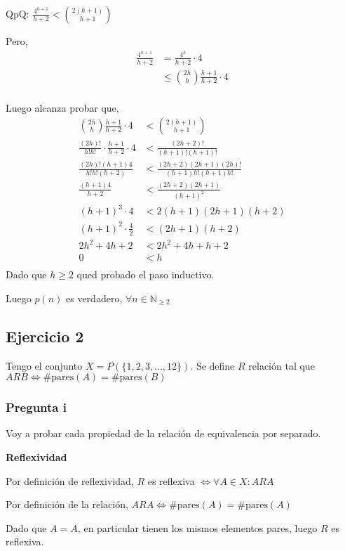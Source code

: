 QpQ: $ \frac{4^{h+1}}{h+2} < \binom{2(h+1)}{h+1} $

Pero,
\begin{align*}
    \frac{4^{h+1}}{h+2} &= \frac{4^h}{h+2} \cdot 4 \\
    &\leq \binom{2h}{h}\frac{h+1}{h+2} \cdot 4 \\
\end{align*}

Luego alcanza probar que,
\begin{align*}
    \binom{2h}{h}\frac{h+1}{h+2} \cdot 4 &< \binom{2(h+1)}{h+1} \\
    \frac{(2h)!}{h!h!} \cdot \frac{h+1}{h+2} \cdot 4 &< \frac{(2h+2)!}{(h+1)!(h+1)!} \\
    \frac{(2h)!(h+1)4}{h!h!(h+2)} &< \frac{(2h+2)(2h+1)(2h)!}{(h+1)h!(h+1)h!} \\
    \frac{(h+1)4}{h+2} &< \frac{(2h+2)(2h+1)}{(h+1)^2} \\
    (h+1)^3 \cdot 4 &< 2(h+1)(2h+1)(h+2) \\
    (h+1)^2 \cdot \frac{4}{2} &< (2h+1)(h+2) \\
    2h^2 + 4h + 2 &< 2h^2 + 4h + h + 2 \\
    0 &< h \\
\end{align*}
Dado que $ h \geq 2 $ qued probado el paso inductivo.

Luego $ p(n) $ es verdadero, $ \forall n \in \mathbb{N}_{\geq 2}$

\subsection{Ejercicio 2}

Tengo el conjunto $ X = P(\{ 1,2,3,...,12 \}) $. Se define $R$ relación tal que $ ARB \iff \#\text{pares}(A) = \#\text{pares}(B) $

\subsubsection{Pregunta i}

Voy a probar cada propiedad de la relación de equivalencia por separado.

\textbf{Reflexividad}

Por definición de reflexividad, $ R $ es reflexiva $ \iff \forall A \in X: ARA $

Por definición de la relación, $ ARA \iff \#\text{pares}(A) = \#\text{pares}(A) $

Dado que $ A = A $, en particular tienen los mismos elementos pares, luego $ R $ es reflexiva.


